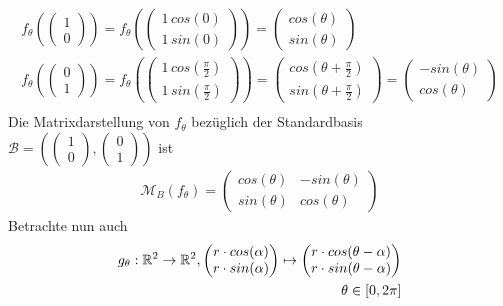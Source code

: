 \begin{align}
f_{\theta} (\begin{pmatrix} 1 \\ 0 \end{pmatrix}) = f_{\theta} (\begin{pmatrix} 1\, cos (0) \\ 1\, sin (0) \end{pmatrix}) = \begin{pmatrix} cos (\theta) \\ sin(\theta)\end{pmatrix} \\
f_{\theta} (\begin{pmatrix} 0 \\ 1 \end{pmatrix}) = f_{\theta} (\begin{pmatrix} 1\, cos (\frac{\pi}{2}) \\ 1\, sin (\frac{\pi}{2}) \end{pmatrix}) = \begin{pmatrix} cos (\theta + \frac{\pi}{2}) \\ sin(\theta + \frac{\pi}{2})\end{pmatrix} =  \begin{pmatrix} - sin(\theta) \\ cos(\theta)\end{pmatrix}\\
\end{align}
Die Matrixdarstellung von $f_{\theta}$ bezüglich der Standardbasis $\mathcal{B} = (\begin{pmatrix} 1 \\ 0\end{pmatrix}, \begin{pmatrix} 0 \\ 1 \end{pmatrix})$ ist
\begin{align}
\mathcal{M}_B(f_{\theta} ) = \begin{pmatrix} cos (\theta) & -sin(\theta) \\ sin(\theta) & cos(\theta)\end{pmatrix}
\end{align}
Betrachte nun auch
\begin{align}
g_{\theta}: \mathbb{R}^2 \rightarrow \mathbb{R}^2, \begin{pmatrix} r \cdot cos (\alpha) \\ r \cdot sin (\alpha)\end{pmatrix} \mapsto \begin{pmatrix} r \cdot cos (\theta-\alpha) \\ r \cdot sin (\theta-\alpha)\end{pmatrix} \\
\theta \in [0, 2\pi]
\end{align}
